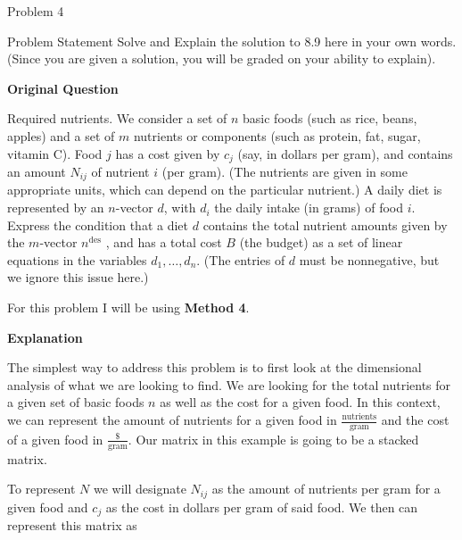 \begin{problem}{Problem 4}
    \begin{statement}{Problem Statement}
        Solve and Explain the solution to 8.9 here in your own words. (Since you are given a solution, you will be graded on your ability to explain). \vspace*{1em}

        \noindent \textbf{Original Question} \vspace*{1em}

        Required nutrients. We consider a set of $n$ basic foods (such as rice, beans, apples) and a set of $m$ nutrients or components (such as protein, fat, sugar, vitamin C). Food $j$ has a cost 
        given by $c_{j}$ (say, in dollars per gram), and contains an amount $N_{ij}$ of nutrient $i$ (per gram). (The nutrients are given in some appropriate units, which can depend on the particular 
        nutrient.) A daily diet is represented by an $n$-vector $d$, with $d_{i}$ the daily intake (in grams) of food $i$. Express the condition that a diet $d$ contains the total nutrient amounts given 
        by the $m$-vector $n^{\text{des}}$ , and has a total cost $B$ (the budget) as a set of linear equations in the variables $d_{1}, \dots , d_{n}$. (The entries of $d$ must be nonnegative, but we 
        ignore this issue here.)
    \end{statement}

    \begin{highlight}[Solution]
        For this problem I will be using \textbf{Method 4}. \vspace*{1em}

        \noindent \textbf{Explanation} \vspace*{1em}

        The simplest way to address this problem is to first look at the dimensional analysis of what we are looking to find. We are looking for the total nutrients for a given set of basic foods $n$ as
        well as the cost for a given food. In this context, we can represent the amount of nutrients for a given food in $\frac{\text{nutrients}}{\text{gram}}$ and the cost of a given food in 
        $\frac{\text{\$}}{\text{gram}}$. Our matrix in this example is going to be a stacked matrix.

        To represent $N$ we will designate $N_{ij}$ as the amount of nutrients per gram for a given food and $c_{j}$ as the cost in dollars per gram of said food. We then can represent this matrix as


\end{highlight}
\end{problem}
